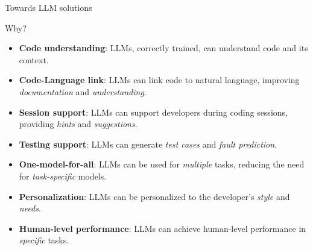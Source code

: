 \documentclass[presentation, 10pt]{beamer}\mode<presentation>{\usetheme{AMSBolognaFC}}
\begin{document}
\begin{frame}{Towards LLM solutions}
	\begin{exampleblock}{Why?}
		\begin{itemize}
			\item \textbf{Code understanding}: LLMs, correctly trained, can understand code and its context.
			\item \textbf{Code-Language link}: LLMs can link code to natural language, improving \emph{documentation} and \emph{understanding}.
			\item \textbf{Session support}: LLMs can support developers during coding sessions, providing \emph{hints} and \emph{suggestions}.
			\item \textbf{Testing support}: LLMs can generate \emph{test cases} and \emph{fault prediction}.
			\item \textbf{One-model-for-all}: LLMs can be used for \emph{multiple} tasks, reducing the need for \emph{task-specific} models.
			\item \textbf{Personalization}: LLMs can be personalized to the developer's \emph{style} and \emph{needs}.
			\item \textbf{Human-level performance}: LLMs can achieve human-level performance in \emph{specific} tasks.
		\end{itemize}
	\end{exampleblock}
\end{frame}
\end{document}

